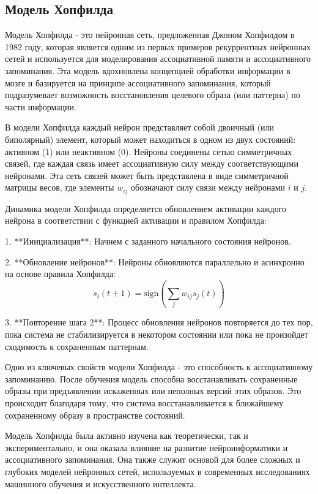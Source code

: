 \subsection{Модель Хопфилда}

Модель Хопфилда - это нейронная сеть, предложенная Джоном Хопфилдом в 1982 году, которая является одним из первых примеров рекуррентных нейронных сетей и используется для моделирования ассоциативной памяти и ассоциативного запоминания. Эта модель вдохновлена концепцией обработки информации в мозге и базируется на принципе ассоциативного запоминания, который подразумевает возможность восстановления целевого образа (или паттерна) по части информации.

В модели Хопфилда каждый нейрон представляет собой двоичный (или биполярный) элемент, который может находиться в одном из двух состояний: активном (1) или неактивном (0). Нейроны соединены сетью симметричных связей, где каждая связь имеет ассоциативную силу между соответствующими нейронами. Эта сеть связей может быть представлена в виде симметричной матрицы весов, где элементы \(w_{ij}\) обозначают силу связи между нейронами \(i\) и \(j\).

Динамика модели Хопфилда определяется обновлением активации каждого нейрона в соответствии с функцией активации и правилом Хопфилда:

1. **Инициализация**: Начнем с заданного начального состояния нейронов.

2. **Обновление нейронов**: Нейроны обновляются параллельно и асинхронно на основе правила Хопфилда:
   \[ s_i(t+1) = \text{sign}\left(\sum_j w_{ij} s_j(t)\right) \]

3. **Повторение шага 2**: Процесс обновления нейронов повторяется до тех пор, пока система не стабилизируется в некотором состоянии или пока не произойдет сходимость к сохраненным паттернам.

Одно из ключевых свойств модели Хопфилда - это способность к ассоциативному запоминанию. После обучения модель способна восстанавливать сохраненные образы при предъявлении искаженных или неполных версий этих образов. Это происходит благодаря тому, что система восстанавливается к ближайшему сохраненному образу в пространстве состояний.

Модель Хопфилда была активно изучена как теоретически, так и экспериментально, и она оказала влияние на развитие нейроинформатики и ассоциативного запоминания. Она также служит основой для более сложных и глубоких моделей нейронных сетей, используемых в современных исследованиях машинного обучения и искусственного интеллекта.
